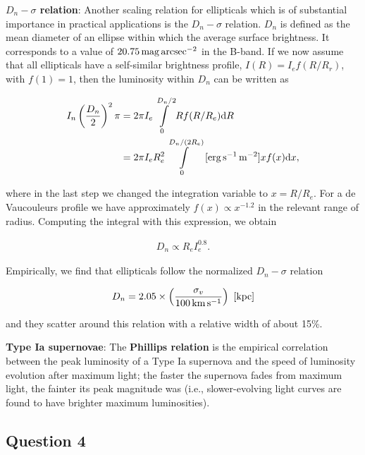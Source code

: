 \documentclass[a4paper,10pt]{article}
\begin{document}
{\noindent}\textbf{$D_n-\sigma$ relation}: Another scaling relation for ellipticals which is of substantial importance in practical applications is the $D_n-\sigma$ relation. $D_n$ is defined as the mean diameter of an ellipse within which the average surface brightness. It corresponds to a value of $20.75\,{\rm mag\,arcsec^{-2}}$ in the B-band. If we now assume that all ellipticals have a self-similar brightness profile, $I(R)=I_ef(R/R_r)$, with $f(1)=1$, then the luminosity within $D_n$ can be written as

\begin{align*}
    I_n\left(\frac{D_n}{2}\right)^2\pi &= 2\pi I_e \int\limits_0^{D_n/2} Rf(R/R_e)\mathrm{d}R \\
    &= 2\pi I_eR_e^2 \int\limits_0^{D_n/(2R_e)} ~ [{\rm erg\,s^{-1}\,m^{-2}}] xf(x)\mathrm{d}x,
\end{align*}

{\noindent}where in the last step we changed the integration variable to $x=R/R_e$. For a de Vaucouleurs profile we have approximately $f(x)\propto x^{-1.2}$ in the relevant range of radius. Computing the integral with this expression, we obtain

\begin{align*}
    D_n \propto R_eI_e^{0.8}.
\end{align*}

{\noindent}Empirically, we find that ellipticals follow the normalized $D_n-\sigma$ relation

\begin{align*}
    D_n = 2.05\times\left(\frac{\sigma_v}{100\,{\rm km\,s^{-1}}}\right) ~ [{\rm kpc}]
\end{align*}

{\noindent}and they scatter around this relation with a relative width of about 15\%.

{\noindent}\textbf{Type Ia supernovae}: The \textbf{Phillips relation} is the empirical correlation between the peak luminosity of a Type Ia supernova and the speed of luminosity evolution after maximum light; the faster the supernova fades from maximum light, the fainter its peak magnitude was (i.e., slower-evolving light curves are found to have brighter maximum luminosities).



\newpage
\subsection{Question 4}
\end{document}

